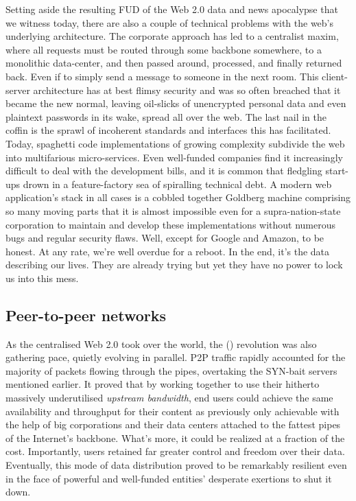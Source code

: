 Setting aside the resulting FUD of the Web 2.0 data and news apocalypse that we witness today, there are also a couple of technical problems with the web's underlying architecture. The corporate approach has led to a centralist maxim, where  all requests must be routed through some backbone somewhere, to a monolithic data-center, and then passed around, processed, and finally returned back. Even if to simply send a message to someone in the next room. This client-server architecture has at best flimsy security and was so often breached that it became the new normal, leaving oil-slicks of unencrypted personal data and even plaintext passwords in its wake, spread all over the web. The last nail in the coffin is the sprawl of incoherent standards and interfaces this has facilitated. Today, spaghetti code implementations of growing complexity subdivide the web into multifarious micro-services. Even well-funded companies find it increasingly difficult to deal with the development bills, and it is common  that fledgling start-ups drown in a feature-factory sea of spiralling technical debt. A modern web application's stack in all cases is a cobbled together Goldberg machine comprising so many moving parts that it is almost impossible even for a supra-nation-state corporation to maintain and develop these implementations without numerous bugs and regular security flaws. Well, except for Google and Amazon, to be honest. At any rate, we're well overdue for a reboot. In the end, it's the data describing our lives. They are already trying but yet they have no power to lock us into this mess.


\subsection{Peer-to-peer networks \statusgreen}\label{sec:peer_to_peer}

As the centralised Web 2.0 took over the world, the  () revolution was also gathering pace, quietly evolving in parallel. P2P traffic rapidly accounted for the majority of packets flowing through the pipes, overtaking the SYN-bait servers mentioned earlier. It proved that by working together to use their hitherto massively underutilised \emph{upstream bandwidth}, end users could achieve the same availability and throughput for their content as previously only achievable with the help of big corporations and their data centers attached to the fattest pipes of the Internet's backbone. What's more, it could be realized at a fraction of the cost. Importantly, users retained far greater control and freedom over their data. Eventually, this mode of data distribution proved to be remarkably resilient even in the face of powerful and well-funded entities' desperate exertions to shut it down.

